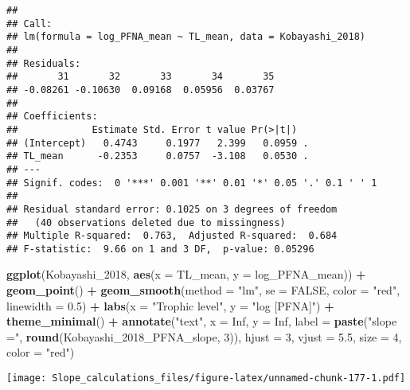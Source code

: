\documentclass[
]{article}
\newenvironment{Shaded}{\begin{snugshade}}{\end{snugshade}}
\newcommand{\AttributeTok}[1]{\textcolor[rgb]{0.13,0.29,0.53}{#1}}
\newcommand{\ConstantTok}[1]{\textcolor[rgb]{0.56,0.35,0.01}{#1}}
\newcommand{\DecValTok}[1]{\textcolor[rgb]{0.00,0.00,0.81}{#1}}
\newcommand{\FloatTok}[1]{\textcolor[rgb]{0.00,0.00,0.81}{#1}}
\newcommand{\FunctionTok}[1]{\textcolor[rgb]{0.13,0.29,0.53}{\textbf{#1}}}
\newcommand{\NormalTok}[1]{#1}
\newcommand{\SpecialCharTok}[1]{\textcolor[rgb]{0.81,0.36,0.00}{\textbf{#1}}}
\newcommand{\StringTok}[1]{\textcolor[rgb]{0.31,0.60,0.02}{#1}}
\begin{document}
\begin{verbatim}
## 
## Call:
## lm(formula = log_PFNA_mean ~ TL_mean, data = Kobayashi_2018)
## 
## Residuals:
##       31       32       33       34       35 
## -0.08261 -0.10630  0.09168  0.05956  0.03767 
## 
## Coefficients:
##             Estimate Std. Error t value Pr(>|t|)  
## (Intercept)   0.4743     0.1977   2.399   0.0959 .
## TL_mean      -0.2353     0.0757  -3.108   0.0530 .
## ---
## Signif. codes:  0 '***' 0.001 '**' 0.01 '*' 0.05 '.' 0.1 ' ' 1
## 
## Residual standard error: 0.1025 on 3 degrees of freedom
##   (40 observations deleted due to missingness)
## Multiple R-squared:  0.763,  Adjusted R-squared:  0.684 
## F-statistic:  9.66 on 1 and 3 DF,  p-value: 0.05296
\end{verbatim}

\begin{Shaded}
\begin{Highlighting}[]
\FunctionTok{ggplot}\NormalTok{(Kobayashi\_2018, }\FunctionTok{aes}\NormalTok{(}\AttributeTok{x =}\NormalTok{ TL\_mean, }\AttributeTok{y =}\NormalTok{ log\_PFNA\_mean)) }\SpecialCharTok{+}
  \FunctionTok{geom\_point}\NormalTok{() }\SpecialCharTok{+}
  \FunctionTok{geom\_smooth}\NormalTok{(}\AttributeTok{method =} \StringTok{"lm"}\NormalTok{, }\AttributeTok{se =} \ConstantTok{FALSE}\NormalTok{, }\AttributeTok{color =} \StringTok{"red"}\NormalTok{, }\AttributeTok{linewidth =} \FloatTok{0.5}\NormalTok{) }\SpecialCharTok{+}
  \FunctionTok{labs}\NormalTok{(}\AttributeTok{x =} \StringTok{"Trophic level"}\NormalTok{,}
       \AttributeTok{y =} \StringTok{"log [PFNA]"}\NormalTok{) }\SpecialCharTok{+}
  \FunctionTok{theme\_minimal}\NormalTok{() }\SpecialCharTok{+}
  \FunctionTok{annotate}\NormalTok{(}\StringTok{"text"}\NormalTok{, }\AttributeTok{x =} \ConstantTok{Inf}\NormalTok{, }\AttributeTok{y =} \ConstantTok{Inf}\NormalTok{, }\AttributeTok{label =} \FunctionTok{paste}\NormalTok{(}\StringTok{"slope ="}\NormalTok{, }\FunctionTok{round}\NormalTok{(Kobayashi\_2018\_PFNA\_slope, }\DecValTok{3}\NormalTok{)), }
           \AttributeTok{hjust =} \DecValTok{3}\NormalTok{, }\AttributeTok{vjust =} \FloatTok{5.5}\NormalTok{, }\AttributeTok{size =} \DecValTok{4}\NormalTok{, }\AttributeTok{color =} \StringTok{"red"}\NormalTok{)}
\end{Highlighting}
\end{Shaded}

\texttt{[image: Slope\_calculations\_files/figure-latex/unnamed-chunk-177-1.pdf]}
\end{document}
